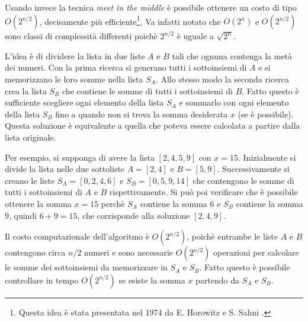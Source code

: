Usando invece la tecnica \textit{meet in the middle} è 
possibile ottenere un costo di tipo $O(2^{n/2})$, decisamente più efficiente\footnote{Questa idea è stata presentata
nel 1974 da E. Horowitz e S. Sahni \cite{hor74}.}.
Va infatti notato che $O(2^n)$ e $O(2^{n/2})$ sono classi di
complessità differenti poichè $2^{n/2}$ è uguale a $\sqrt{2^n}$.

L'idea è di dividere la lista in due liste $A$ e $B$ tali che ognuna 
contenga la metà dei numeri.
Con la prima ricerca si generano tutti i sottoinsiemi di $A$
e si memorizzano le loro somme nella lista $S_A$.
Allo stesso modo la seconda ricerca crea la lista $S_B$ 
che contiene le somme di tutti i sottoinsiemi di $B$.
Fatto questo è sufficiente scegliere ogni elemento della lista $S_A$ 
e sommarlo con ogni elemento della lista $S_B$ fino a quando
non si trova la somma desiderata $x$ (se è possibile).
Questa soluzione è equivalente a quella che poteva essere
calcolata a partire dalla lista originale.

Per esempio, si supponga di avere la lista $[2,4,5,9]$ con $x=15$.
Inizialmente si divide la lista nelle due sottoliste
$A=[2,4]$ e $B=[5,9]$.
Successivamente si creano le liste
$S_A=[0,2,4,6]$ e $S_B=[0,5,9,14]$ che contengono
le somme di tutti i sottoinsiemi di $A$ e $B$ rispettivamente.
Si può poi verificare che è possibile ottenere la somma
$x=15$ perchè $S_A$ contiene la somma $6$ e 
$S_B$ contiene la somma $9$, quindi $6+9=15$,
che corrisponde alla soluzione $[2,4,9]$.

Il costo computazionale dell'algoritmo è $O(2^{n/2})$,
poichè entrambe le liste $A$ e $B$ contengono circa $n/2$ numeri
e sono necessarie $O(2^{n/2})$ operazioni per calcolare le somme
dei sottoinsiemi da memorizzare in $S_A$ e $S_B$.
Fatto questo è possibile controllare in tempo 
$O(2^{n/2})$ se esiste la somma $x$ partendo da
$S_A$ e $S_B$.